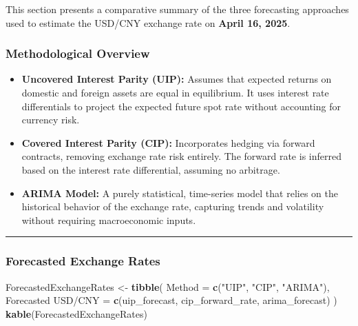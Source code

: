\documentclass[
]{article}
\newenvironment{Shaded}{\begin{snugshade}}{\end{snugshade}}
\newcommand{\AttributeTok}[1]{\textcolor[rgb]{0.13,0.29,0.53}{#1}}
\newcommand{\FunctionTok}[1]{\textcolor[rgb]{0.13,0.29,0.53}{\textbf{#1}}}
\newcommand{\NormalTok}[1]{#1}
\newcommand{\OtherTok}[1]{\textcolor[rgb]{0.56,0.35,0.01}{#1}}
\newcommand{\StringTok}[1]{\textcolor[rgb]{0.31,0.60,0.02}{#1}}
\begin{document}
This section presents a comparative summary of the three forecasting
approaches used to estimate the USD/CNY exchange rate on \textbf{April
16, 2025}.

\subsubsection{Methodological Overview}\label{methodological-overview}

\begin{itemize}
\item
  \textbf{Uncovered Interest Parity (UIP):} Assumes that expected
  returns on domestic and foreign assets are equal in equilibrium. It
  uses interest rate differentials to project the expected future spot
  rate without accounting for currency risk.
\item
  \textbf{Covered Interest Parity (CIP):} Incorporates hedging via
  forward contracts, removing exchange rate risk entirely. The forward
  rate is inferred based on the interest rate differential, assuming no
  arbitrage.
\item
  \textbf{ARIMA Model:} A purely statistical, time-series model that
  relies on the historical behavior of the exchange rate, capturing
  trends and volatility without requiring macroeconomic inputs.
\end{itemize}

\begin{center}\rule{0.5\linewidth}{0.5pt}\end{center}

\subsubsection{Forecasted Exchange
Rates}\label{forecasted-exchange-rates}

\begin{Shaded}
\begin{Highlighting}[]
\NormalTok{ForecastedExchangeRates }\OtherTok{\textless{}{-}} \FunctionTok{tibble}\NormalTok{(}
  \AttributeTok{Method =} \FunctionTok{c}\NormalTok{(}\StringTok{"UIP"}\NormalTok{, }\StringTok{"CIP"}\NormalTok{, }\StringTok{"ARIMA"}\NormalTok{),}
  \StringTok{\textasciigrave{}}\AttributeTok{Forecasted USD/CNY}\StringTok{\textasciigrave{}} \OtherTok{=} \FunctionTok{c}\NormalTok{(uip\_forecast, cip\_forward\_rate, arima\_forecast)}
\NormalTok{)}
\FunctionTok{kable}\NormalTok{(ForecastedExchangeRates)}
\end{Highlighting}
\end{Shaded}
\end{document}

